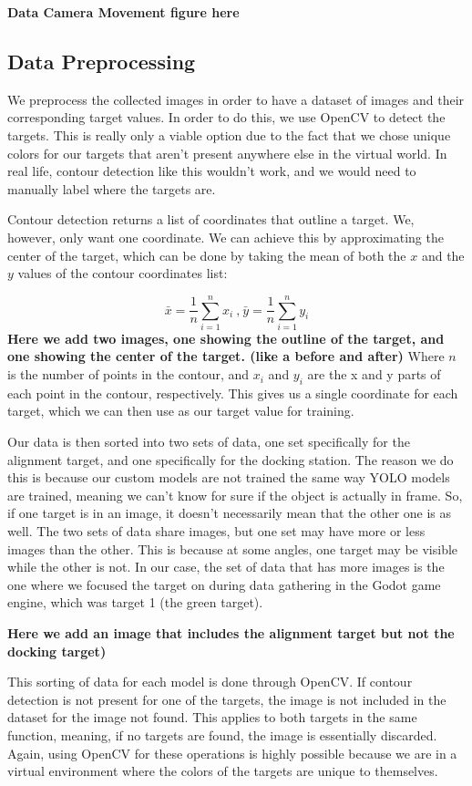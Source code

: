 \textbf{Data Camera Movement figure here}

\subsection{Data Preprocessing}
We preprocess the collected images in order to have a dataset of images and their corresponding target values. In order to do this, we use OpenCV to detect the targets. This is really only a viable option due to the fact that we chose unique colors for our targets that aren't present anywhere else in the virtual world. In real life, contour detection like this wouldn't work, and we would need to manually label where the targets are.

Contour detection returns a list of coordinates that outline a target. We, however, only want one coordinate. We can achieve this by approximating the center of the target, which can be done by taking the mean of both the \(x\) and the \(y\) values of the contour coordinates list:

\[
	\bar{x} = \frac{1}{n}\sum_{i=1}^{n} x_i ~\text{,} ~\bar{y} = \frac{1}{n}\sum_{i=1}^{n} y_i
\]
\textbf{Here we add two images, one showing the outline of the target, and one showing the center of the target. (like a before and after)}
Where \(n\) is the number of points in the contour, and \(x_i\) and \(y_i\) are the x and y parts of each point in the contour, respectively. This gives us a single coordinate for each target, which we can then use as our target value for training.

Our data is then sorted into two sets of data, one set specifically for the alignment target, and one specifically for the docking station. The reason we do this is because our custom models are not trained the same way YOLO models are trained, meaning we can't know for sure if the object is actually in frame. So, if one target is in an image, it doesn't necessarily mean that the other one is as well. The two sets of data share images, but one set may have more or less images than the other. This is because at some angles, one target may be visible while the other is not. In our case, the set of data that has more images is the one where we focused the target on during data gathering in the Godot game engine, which was target 1 (the green target). 

\textbf{Here we add an image that includes the alignment target but not the docking target)}

This sorting of data for each model is done through OpenCV. If contour detection is not present for one of the targets, the image is not included in the dataset for the image not found. This applies to both targets in the same function, meaning, if no targets are found, the image is essentially discarded. Again, using OpenCV for these operations is highly possible because we are in a virtual environment where the colors of the targets are unique to themselves.

